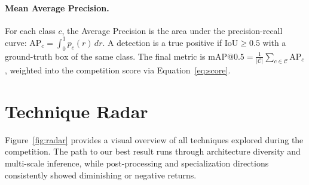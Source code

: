 \documentclass[11pt,a4paper]{article}
\begin{document}
\paragraph{Mean Average Precision.}
For each class $c$, the Average Precision is the area under the precision-recall curve: $\text{AP}_c = \int_0^1 p_c(r)\, dr$.
A detection is a true positive if $\text{IoU} \geq 0.5$ with a ground-truth box of the same class.
The final metric is $\text{mAP}@0.5 = \frac{1}{|\mathcal{C}|} \sum_{c \in \mathcal{C}} \text{AP}_c$, weighted into the competition score via Equation~\ref{eq:score}.

\section{Technique Radar}
\label{sec:radar}

Figure~\ref{fig:radar} provides a visual overview of all techniques explored during the competition.
The path to our best result runs through architecture diversity and multi-scale inference, while post-processing and specialization directions consistently showed diminishing or negative returns.
\end{document}
